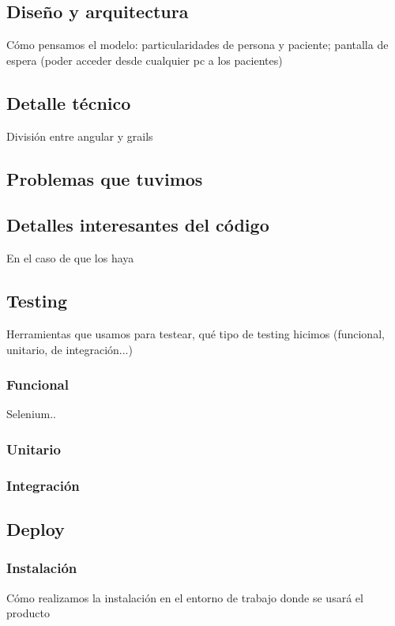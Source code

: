 \documentclass[a4paper,10pt]{article}
\begin{document}
\subsection{Diseño y arquitectura}
Cómo pensamos el modelo: particularidades de persona y paciente; pantalla de espera (poder acceder desde cualquier pc a los pacientes)

\subsection{Detalle técnico}
División entre angular y grails

\subsection{Problemas que tuvimos}


\subsection{Detalles interesantes del código}
En el caso de que los haya 




\subsection{Testing}
Herramientas que usamos para testear, qué tipo de testing hicimos (funcional, unitario, de integración...)
\subsubsection{Funcional}
Selenium..
\subsubsection{Unitario}

\subsubsection{Integración}

\subsection{Deploy}


\subsubsection{Instalación}
Cómo realizamos la instalación en el entorno de trabajo donde se usará el producto
\end{document}
